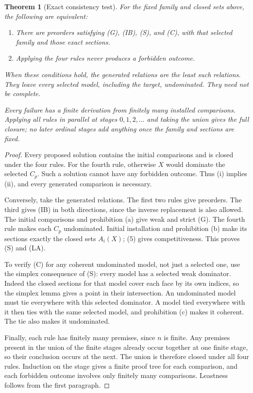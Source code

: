 \documentclass[11pt]{article}
\newtheorem{theorem}{Theorem}
\theoremstyle{remark}\newtheorem{remark}[theorem]{Remark}
\begin{document}
\begin{theorem}[Exact consistency test]\label{thm:closure}
For the fixed family and closed sets above, the following are equivalent:
\begin{enumerate}[label=(\roman*),leftmargin=*]
\item There are preorders satisfying (G), (IB), (S), and (C), with that
      selected family and those exact sections.
\item Applying the four rules never produces a forbidden outcome.
\end{enumerate}
When these conditions hold, the generated relations are the least such
relations. They leave every selected model, including the target,
undominated. They need not be complete.

Every failure has a finite derivation from finitely many installed
comparisons. Applying all rules in parallel at stages $0,1,2,\ldots$ and
taking the union gives the full closure; no later ordinal stages add
anything once the family and sections are fixed.
\end{theorem}
\begin{proof}
Every proposed solution contains the initial comparisons and is closed
under the four rules. For the fourth rule, otherwise $X$ would dominate
the selected $C_p$. Such a solution cannot have any forbidden outcome.
Thus (i) implies (ii), and every generated comparison is necessary.

Conversely, take the generated relations. The first two rules give
preorders. The third gives (IB) in both directions, since the inverse
replacement is also allowed. The initial comparisons and prohibition (a)
give weak and strict (G). The fourth rule makes each $C_p$ undominated.
Initial installation and prohibition (b) make its sections exactly the
closed sets $A_i(X)$; (5) gives competitiveness. This proves (S) and (LA).

To verify (C) for any coherent undominated model, not just a selected
one, use the simplex consequence of (S): every model has a selected weak
dominator. Indeed the closed sections for that model cover each face by
its own indices, so the simplex lemma gives a point in their intersection.
An undominated model must tie everywhere with this selected dominator.
A model tied everywhere with it then ties with the same selected model,
and prohibition (c) makes it coherent. The tie also makes it undominated.

Finally, each rule has finitely many premises, since $n$ is finite.
Any premises present in the union of the finite stages already occur
together at one finite stage, so their conclusion occurs at the next.
The union is therefore closed under all four rules. Induction on the
stage gives a finite proof tree for each comparison, and each forbidden
outcome involves only finitely many comparisons. Leastness follows from
the first paragraph.
\end{proof}
\end{document}
